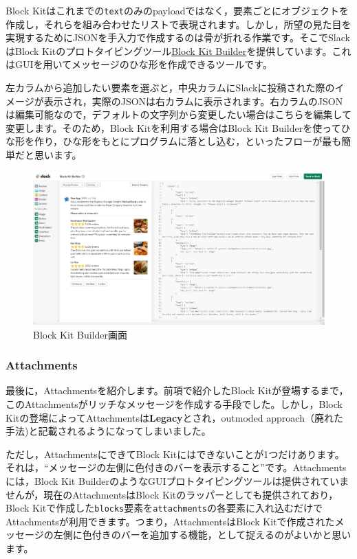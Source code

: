\documentclass[uplatex,a4j]{jsarticle}
\begin{document}
Block Kitはこれまでの\verb|text|のみのpayloadではなく，要素ごとにオブジェクトを作成し，それらを組み合わせたリストで表現されます。しかし，所望の見た目を実現するためにJSONを手入力で作成するのは骨が折れる作業です。そこでSlackはBlock Kitのプロトタイピングツール\href{https://api.slack.com/tools/block-kit-builder}{Block Kit Builder}を提供しています。これはGUIを用いてメッセージのひな形を作成できるツールです。


左カラムから追加したい要素を選ぶと，中央カラムにSlackに投稿された際のイメージが表示され，実際のJSONは右カラムに表示されます。右カラムのJSONは編集可能なので，デフォルトの文字列から変更したい場合はこちらを編集して変更します。そのため，Block Kitを利用する場合はBlock Kit Builderを使ってひな形を作り，ひな形をもとにプログラムに落とし込む，といったフローが最も簡単だと思います。

\begin{figure}[H]
 \centering
 \includegraphics[keepaspectratio, scale=0.35]{images/block_kit_builder.png}
 \caption{Block Kit Builder画面}
 \label{fig:block_kit_builder}
\end{figure}

\subsubsection{Attachments}

最後に，Attachmentsを紹介します。前項で紹介したBlock Kitが登場するまで，このAttachmentsがリッチなメッセージを作成する手段でした。しかし，Block Kitの登場によってAttachmentsは\textbf{Legacy}とされ，outmoded approach（廃れた手法)と記載されるようになってしまいました。

ただし，AttachmentsにできてBlock Kitにはできないことが1つだけあります。それは，``メッセージの左側に色付きのバーを表示すること''です。Attachmentsには，Block Kit BuilderのようなGUIプロトタイピングツールは提供されていませんが，現在のAttachmentsはBlock Kitのラッパーとしても提供されており，Block Kitで作成した\verb|blocks|要素を\verb|attachments|の各要素に入れ込むだけでAttachmentsが利用できます。つまり，AttachmentsはBlock Kitで作成されたメッセージの左側に色付きのバーを追加する機能，として捉えるのがよいかと思います。
\end{document}
